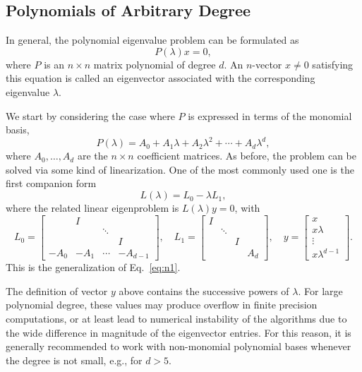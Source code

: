 \subsection{\label{sec:pep1}Polynomials of Arbitrary Degree}

In general, the polynomial eigenvalue problem can be formulated as
\begin{equation}
\label{eq:pep}
P(\lambda)x=0,
\end{equation}
where $P$ is an $n\times n$ matrix polynomial of degree $d$. An $n$-vector $x\neq 0$ satisfying this equation is called an eigenvector associated with the corresponding eigenvalue $\lambda$.

We start by considering the case where $P$ is expressed in terms of the monomial basis,
\begin{equation}
\label{eq:pepmon}
P(\lambda)=A_0+A_1 \lambda+A_2\lambda^2 +  \dotsb + A_d \lambda^d,
\end{equation}
where $A_0,\ldots,A_d$ are the $n\times n$ coefficient matrices. As before, the problem can be solved via some kind of linearization. One of the most commonly used one is the first companion form
\begin{equation}
\label{eq:firstcomp}
L(\lambda)=L_0 -\lambda L_1,
\end{equation}
where the related linear eigenproblem is $L(\lambda)y=0$, with
\begin{equation}
\label{eq:firstcompfull}
L_0 =
\begin{bmatrix}
  & I \\
  & & \ddots \\
  & & & I \\
  -A_0 & -A_1 & \cdots  & -A_{d-1}
\end{bmatrix},\quad
L_1 =
\begin{bmatrix}
  I \\
  & \ddots \\
  & & I \\
  & & & A_d
\end{bmatrix}, \quad
y=
\begin{bmatrix}
  x \\ x\lambda\\ \vdots \\ x\lambda^{d-1}
\end{bmatrix}.
\end{equation}
This is the generalization of Eq.\ \ref{eq:n1}.

The definition of vector $y$ above contains the successive powers of $\lambda$. For large polynomial degree, these values may produce overflow in finite precision computations, or at least lead to numerical instability of the algorithms due to the wide difference in magnitude of the eigenvector entries. For this reason, it is generally recommended to work with non-monomial polynomial bases whenever the degree is not small, e.g., for $d>5$.

